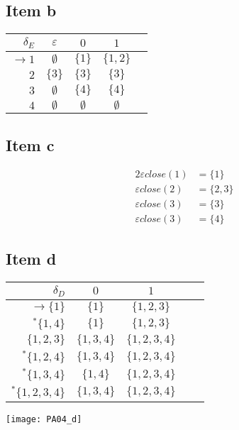 {\subsection{Item b}
\begin{center}
\begin{tabular}{r | c c c c}
	$     \delta_E$ & $\varepsilon$ & $0        $ & $1        $ \\ \hline
	$\rightarrow 1$ & $\emptyset  $ & $\{1\}    $ & $\{1,2\}  $ \\
	$            2$ & $\{3\}      $ & $\{3\}    $ & $\{3  \}  $ \\
	$            3$ & $\emptyset  $ & $\{4\}    $ & $\{4  \}  $ \\
	$            4$ & $\emptyset  $ & $\emptyset$ & $\emptyset$
\end{tabular}
\end{center}
\subsection{Item c}
\begin{alignat*}{2}
	\varepsilon close(1) &= \{1\}\\
	\varepsilon close(2) &= \{2,3\}\\
	\varepsilon close(3) &= \{3\}\\
	\varepsilon close(3) &= \{4\}
\end{alignat*}
\subsection{Item d}
\begin{center}
\begin{tabular}{r | c c c c}
	$             \delta_D$ & $0        $ & $1          $ \\ \hline
	$\rightarrow \{1      \}$ & $\{1    \}$ & $\{1,2,3  \}$ \\
	$      ^\ast \{1,4    \}$ & $\{1    \}$ & $\{1,2,3  \}$ \\
	$            \{1,2,3  \}$ & $\{1,3,4\}$ & $\{1,2,3,4\}$ \\
	$      ^\ast \{1,2,4  \}$ & $\{1,3,4\}$ & $\{1,2,3,4\}$ \\
	$      ^\ast \{1,3,4  \}$ & $\{1,4  \}$ & $\{1,2,3,4\}$ \\
	$      ^\ast \{1,2,3,4\}$ & $\{1,3,4\}$ & $\{1,2,3,4\}$
\end{tabular}
\end{center}
\begin{center} \texttt{[image: PA04\_d]} \end{center}
}